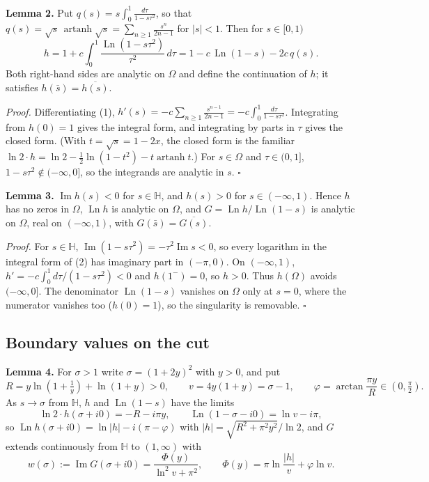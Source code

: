 \documentclass[
  11pt,
]{article}
\begin{document}
\textbf{Lemma 2.} Put \(q(s) = s \int_0^1 \frac{d\tau}{1 - s\tau^2}\),
so that
\(q(s) = \sqrt{s}\,\operatorname{artanh}\sqrt{s} = \sum_{n\ge1} \frac{s^n}{2n-1}\)
for \(|s| < 1\). Then for \(s \in [0,1)\) \[
h = 1 + c \int_0^1 \frac{\operatorname{Ln}(1 - s\tau^2)}{\tau^2}\, d\tau = 1 - c\, \operatorname{Ln}(1-s) - 2c\, q(s). \tag{2}
\] Both right-hand sides are analytic on \(\Omega\) and define the
continuation of \(h\); it satisfies \(h(\bar s) = \overline{h(s)}\).

\emph{Proof.} Differentiating (1),
\(h'(s) = -c\sum_{n\ge1} \frac{s^{n-1}}{2n-1} = -c \int_0^1 \frac{d\tau}{1 - s\tau^2}\).
Integrating from \(h(0) = 1\) gives the integral form, and integrating
by parts in \(\tau\) gives the closed form. (With
\(t = \sqrt s = 1 - 2x\), the closed form is the familiar
\(\ln 2 \cdot h = \ln 2 - \tfrac12\ln(1-t^2) - t\operatorname{artanh} t\).)
For \(s \in \Omega\) and \(\tau \in (0,1]\),
\(1 - s\tau^2 \notin (-\infty, 0]\), so the integrands are analytic in
\(s\). \(\square\)

\textbf{Lemma 3.} \(\operatorname{Im} h(s) < 0\) for
\(s \in \mathbb{H}\), and \(h(s) > 0\) for \(s \in (-\infty, 1)\). Hence
\(h\) has no zeros in \(\Omega\), \(\operatorname{Ln} h\) is analytic on
\(\Omega\), and \(G = \operatorname{Ln} h / \operatorname{Ln}(1-s)\) is
analytic on \(\Omega\), real on \((-\infty,1)\), with
\(G(\bar s) = \overline{G(s)}\).

\emph{Proof.} For \(s \in \mathbb{H}\),
\(\operatorname{Im}(1 - s\tau^2) = -\tau^2 \operatorname{Im} s < 0\), so
every logarithm in the integral form of (2) has imaginary part in
\((-\pi, 0)\). On \((-\infty,1)\),
\(h' = -c\int_0^1 d\tau/(1-s\tau^2) < 0\) and \(h(1^-) = 0\), so
\(h > 0\). Thus \(h(\Omega)\) avoids \((-\infty,0]\). The denominator
\(\operatorname{Ln}(1-s)\) vanishes on \(\Omega\) only at \(s = 0\),
where the numerator vanishes too (\(h(0) = 1\)), so the singularity is
removable. \(\square\)

\hypertarget{boundary-values-on-the-cut}{%
\subsection{Boundary values on the
cut}\label{boundary-values-on-the-cut}}

\textbf{Lemma 4.} For \(\sigma > 1\) write \(\sigma = (1+2y)^2\) with
\(y > 0\), and put \[
R = y\ln(1+\tfrac1y) + \ln(1+y) > 0, \qquad v = 4y(1+y) = \sigma - 1, \qquad \varphi = \arctan\frac{\pi y}{R} \in (0, \tfrac\pi2).
\] As \(s \to \sigma\) from \(\mathbb{H}\), \(h\) and
\(\operatorname{Ln}(1-s)\) have the limits \[
\ln 2 \cdot h(\sigma + i0) = -R - i\pi y, \qquad \operatorname{Ln}(1 - \sigma - i0) = \ln v - i\pi,
\] so \(\operatorname{Ln} h(\sigma + i0) = \ln|h| - i(\pi - \varphi)\)
with \(|h| = \sqrt{R^2 + \pi^2 y^2}/\ln 2\), and \(G\) extends
continuously from \(\mathbb{H}\) to \((1,\infty)\) with \[
w(\sigma) := \operatorname{Im} G(\sigma + i0) = \frac{\Phi(y)}{\ln^2 v + \pi^2}, \qquad \Phi(y) = \pi \ln\frac{|h|}{v} + \varphi \ln v .
\]
\end{document}
